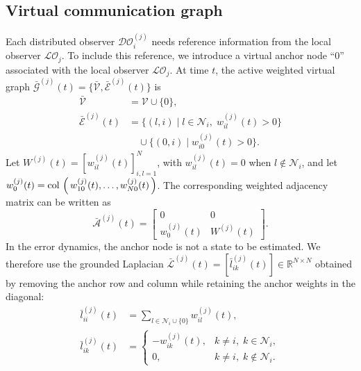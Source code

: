 \documentclass[letterpaper,journal]{IEEEtran}
\def\col#1{\mathop{{\rm col}\,\left(\,#1\,\right)}}
\def\V{\mathcal{V}} %
\def\E{\mathcal{E}} %
\def\G{\mathcal{G}} %
\def\A{\mathcal{A}} %
\def\L{\mathcal{L}} %
\def\N{\mathcal{N}} %
\def\LO{\mathcal{LO}} %
\def\DO{\mathcal{DO}} %
\begin{document}
\subsection{Virtual communication graph}
Each distributed observer $\DO_{i}^{(j)}$ needs reference information from the local observer $\LO_{j}$.
    To include this reference, we introduce a virtual anchor node ``0'' associated with the local observer $\LO_j$. At time $t$, the active weighted virtual graph $\bar{\G}^{(j)}(t)=\{\bar{\V},\bar{\E}^{(j)}(t)\}$ is
    \begin{equation}
        \begin{aligned}
            \bar{\V} &= \V \cup \{0\}, \\
            \bar{\E}^{(j)}(t)
            &= \{(l,i)\mid l\in\N_i,\; w_{il}^{(j)}(t)>0\}\\
            &\quad\cup \{(0,i)\mid w_{i0}^{(j)}(t)>0\}.
        \end{aligned}
    \end{equation}
    Let $W^{(j)}(t)=[w_{il}^{(j)}(t)]_{i,l=1}^{N}$, with $w_{il}^{(j)}(t)=0$ when $l\notin\N_i$, and let
    $w_{0}^{(j)}(t)=\col{w_{10}^{(j)}(t),\ldots,w_{N0}^{(j)}(t)}$.
    The corresponding weighted adjacency matrix can be written as
    \begin{equation}
        \bar{\A}^{(j)}(t)  = \begin{bmatrix} 0 & 0 \\
                        w_{0}^{(j)}(t) & W^{(j)}(t) \end{bmatrix}.
    \end{equation}
    In the error dynamics, the anchor node is not a state to be estimated. We therefore use the grounded Laplacian
    $\bar{\L}^{(j)}(t)=[\bar l_{ik}^{(j)}(t)]\in\mathbb{R}^{N\times N}$ obtained by removing the anchor row and column while retaining the anchor weights in the diagonal:
    \begin{equation}
        \begin{aligned}
    \bar{l}_{ii}^{(j)}(t) &=\sum_{l\in \N_i\cup\{0\}} w_{il}^{(j)}(t),\\
    \bar{l}_{ik}^{(j)}(t)&=
    \begin{cases}
    -w_{ik}^{(j)}(t), & k\neq i,\; k\in\N_i,\\
    0, & k\neq i,\; k\notin\N_i.
    \end{cases}
    \end{aligned}
\end{equation}
\end{document}
